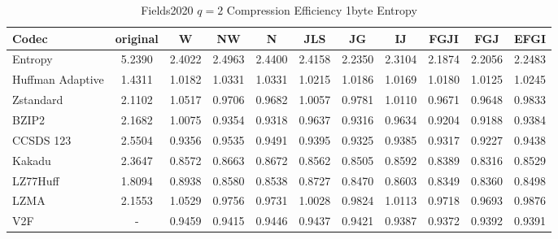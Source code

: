 \documentclass{article}
\begin{document}
\begin{table}[h!]
\centering
\caption{Fields2020 $q=2$ Compression Efficiency 1byte Entropy}
\begin{tabular}{|l|cccccccccc|}
\hline
Codec &  original &      W &     NW &      N &    JLS &     JG &     IJ &   FGJI &    FGJ &   EFGI \\
\hline
Entropy & 5.2390 & 2.4022 & 2.4963 & 2.4400 & 2.4158 & 2.2350 & 2.3104 & 2.1874 & 2.2056 & 2.2483 \\
\hline
Huffman Adaptive &    1.4311 & 1.0182 & 1.0331 & 1.0331 & 1.0215 & 1.0186 & 1.0169 & 1.0180 & 1.0125 & 1.0245 \\
Zstandard        &    2.1102 & 1.0517 & 0.9706 & 0.9682 & 1.0057 & 0.9781 & 1.0110 & 0.9671 & 0.9648 & 0.9833 \\
BZIP2            &    2.1682 & 1.0075 & 0.9354 & 0.9318 & 0.9637 & 0.9316 & 0.9634 & 0.9204 & 0.9188 & 0.9384 \\
CCSDS 123        &    2.5504 & 0.9356 & 0.9535 & 0.9491 & 0.9395 & 0.9325 & 0.9385 & 0.9317 & 0.9227 & 0.9438 \\
Kakadu           &    2.3647 & 0.8572 & 0.8663 & 0.8672 & 0.8562 & 0.8505 & 0.8592 & 0.8389 & 0.8316 & 0.8529 \\
LZ77Huff         &    1.8094 & 0.8938 & 0.8580 & 0.8538 & 0.8727 & 0.8470 & 0.8603 & 0.8349 & 0.8360 & 0.8498 \\
LZMA             &    2.1553 & 1.0529 & 0.9756 & 0.9731 & 1.0028 & 0.9824 & 1.0113 & 0.9718 & 0.9693 & 0.9876 \\
V2F              &   - & 0.9459 & 0.9415 & 0.9446 & 0.9437 & 0.9421 & 0.9387 & 0.9372 & 0.9392 & 0.9391 \\
\hline
\end{tabular}
\end{table}
\end{document}
